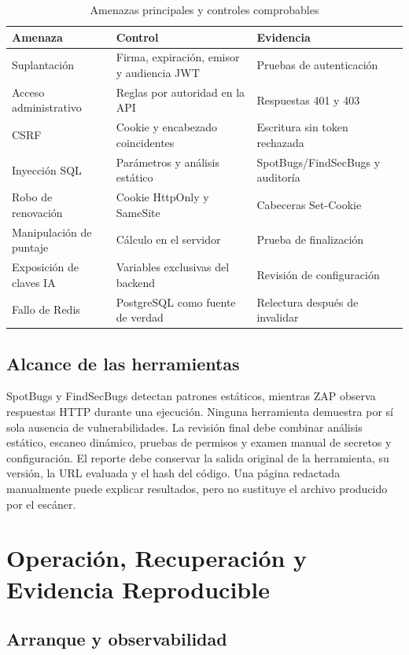\documentclass[11pt,a4paper]{report}
\begin{document}
\begin{table}[htbp]
\centering
\caption{Amenazas principales y controles comprobables}
\begin{tabularx}{\textwidth}{p{3.2cm}X X}
\toprule
\textbf{Amenaza} & \textbf{Control} & \textbf{Evidencia} \\
\midrule
Suplantación & Firma, expiración, emisor y audiencia JWT & Pruebas de autenticación \\
Acceso administrativo & Reglas por autoridad en la API & Respuestas 401 y 403 \\
CSRF & Cookie y encabezado coincidentes & Escritura sin token rechazada \\
Inyección SQL & Parámetros y análisis estático & SpotBugs/FindSecBugs y auditoría \\
Robo de renovación & Cookie HttpOnly y SameSite & Cabeceras Set-Cookie \\
Manipulación de puntaje & Cálculo en el servidor & Prueba de finalización \\
Exposición de claves IA & Variables exclusivas del backend & Revisión de configuración \\
Fallo de Redis & PostgreSQL como fuente de verdad & Relectura después de invalidar \\
\bottomrule
\end{tabularx}
\end{table}

\section{Alcance de las herramientas}

SpotBugs y FindSecBugs detectan patrones estáticos, mientras ZAP observa respuestas
HTTP durante una ejecución. Ninguna herramienta demuestra por sí sola ausencia de
vulnerabilidades. La revisión final debe combinar análisis estático, escaneo dinámico,
pruebas de permisos y examen manual de secretos y configuración. El reporte debe
conservar la salida original de la herramienta, su versión, la URL evaluada y el hash
del código. Una página redactada manualmente puede explicar resultados, pero no
sustituye el archivo producido por el escáner.

\chapter{Operación, Recuperación y Evidencia Reproducible}
\label{anexo:operacion}

\section{Arranque y observabilidad}
\end{document}
